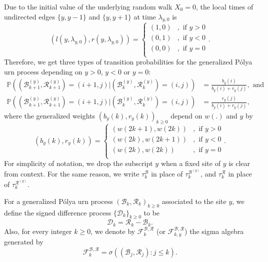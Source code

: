 \documentclass[twoside,12pt,a4paper]{article}
\numberwithin{equation}{section}
\begin{document}
	Due to the initial value of the underlying random walk $X_0=0$, the local times of undirected edges $\{y,y-1\}$ and $\{y,y+1\}$ at time $\lambda_{y,0}$ is 
	\begin{equation}\label{eq: initial condition}
		\left(l(y,\lambda_{y,0}),  r( y ,\lambda_{y,0})\right) =  \begin{cases}	
			(1, 0) &,  \text{ if }  y>0 \\
			(0, 1) &,  \text{ if }  y<0 \\  
			(0, 0) &,  \text{ if }  y=0 \\
		\end{cases} 
		.\end{equation}	
	Therefore, we get three types of transition probabilities
	for the generalized P\'{o}lya urn process depending on $y>0$, $y<0$ or $y=0$:
	\begin{align*}\label{eq: transition prob for GPU}
		\mathbb{P} \left(\left(\mathcal{B}^{(y)}_{k+1},\mathcal{R}^{(y)}_{k+1} \right)=  (i+1,j) \vert (\mathcal{B}^{(y)}_{k},\mathcal{R}^{(y)}_{k}) =(i,j)  \right) &= \frac{b_y(i)}{b_y(i)+r_y(j)}, \mbox{ and}  \\
		\mathbb{P} \left((\mathcal{B}^{(y)}_{k+1},\mathcal{R}^{(y)}_{k+1})=  (i+1,j) \vert (\mathcal{B}^{(y)}_{k},\mathcal{R}^{(y)}_{k}) =(i,j)  \right) &= \frac{r_y(j)}{b_y(i)+r_y(j)},
	\end{align*} 
	where the generalized weights $(b_y(k),r_y(k))_{k\geq 0}$ depend on $w(.)$ and $y$ by  
	\begin{equation}\label{eq: generalized weights}
		(b_y(k), r_y(k)) = \begin{cases}
			(w(2k+1), w(2k)) &,  \text{ if }  y>0 \\
			(w(2k), w(2k+1)) &,  \text{ if }  y<0 \\  
			(w(2k), w(2k)) &,  \text{ if }  y=0 \\ 
		\end{cases}.
	\end{equation}
	For simplicity of notation, we drop the subscript $y$ when a fixed site of $y$ is clear from context. For the same reason, we write $\tau_k^{\mathcal{B}}$ in place of $\tau_k^{\mathcal{B}^{(y)}}$, and $\tau_k^{\mathcal{R}}$ in place of $\tau_k^{\mathcal{R}^{(y)}}$.
	
	For a generalized P\'{o}lya urn process $(\mathcal{B}_k,\mathcal{R}_k )_{k\geq 0}$ associated to the site $y$, we define the signed difference process $\{\mathcal{D}_{k}\}_{k \ge 0} $ to be
	\begin{equation}\label{eq:signed difference}
		\mathcal{D}_k  =\mathcal{R}_k -\mathcal{B}_k.  
	\end{equation}
	Also, for every integer $k\geq 0$, we denote by $\mathcal{F}^{\mathcal{B},\mathcal{R}}_k$ (or $\mathcal{F}^{\mathcal{B},\mathcal{R}}_{k,y}$) the sigma algebra generated by  
	\[\mathcal{F}^{\mathcal{B},\mathcal{R}}_k = \sigma\left((\mathcal{B}_j,\mathcal{R}_j ): j\leq k \right).
	\]  
	
\end{document}
